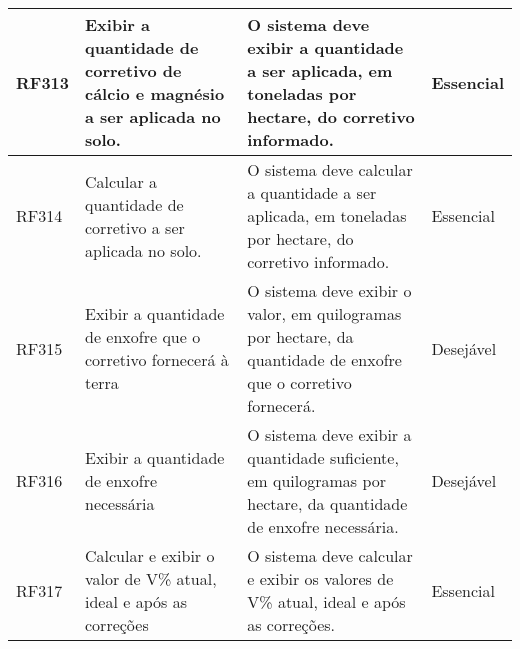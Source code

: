\begin{longtable}{|p{1.5cm}|p{3cm}|p{7cm}|p{2.5cm}|}
    RF313 & Exibir a quantidade de corretivo de cálcio e magnésio a ser aplicada no solo.    & O sistema deve exibir a quantidade a ser aplicada, em toneladas por hectare, do corretivo informado.                                                                                                                                                                                                    & Essencial  \\\hline
    RF314 & Calcular a quantidade de corretivo a ser aplicada no solo.                       & O sistema deve calcular a quantidade a ser aplicada, em toneladas por hectare, do corretivo informado.                                                                                                                                                                                                  & Essencial  \\\hline
    RF315 & Exibir a quantidade de enxofre que o corretivo fornecerá à terra                 & O sistema deve exibir o valor, em quilogramas por hectare, da quantidade de enxofre que o corretivo fornecerá.                                                                                                                                                                                          & Desejável  \\\hline
    RF316 & Exibir a quantidade de enxofre necessária                                        & O sistema deve exibir a quantidade suficiente, em quilogramas por hectare, da quantidade de enxofre necessária.                                                                                                                                                                                         & Desejável  \\\hline
    RF317 & Calcular e exibir o valor de V\% atual, ideal e após as correções                & O sistema deve calcular e exibir os valores de V\% atual, ideal e após as correções.                                                                                                                                                                                                                    & Essencial  \\\hline\hline
\end{longtable}
